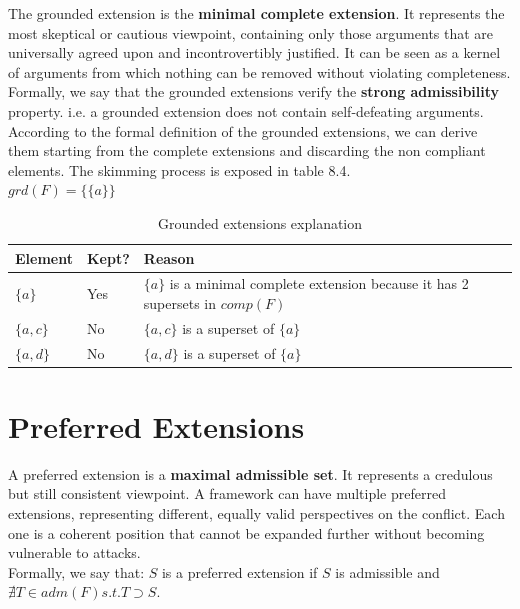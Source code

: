 \documentclass{scrbook}
\begin{document}
The grounded extension is the \textbf{minimal complete extension}. It represents the most skeptical or cautious viewpoint, containing only those arguments that are universally agreed upon and incontrovertibly justified. It can be seen as a kernel of arguments from which nothing can be removed without violating completeness. Formally, we say that the grounded extensions verify the \textbf{strong admissibility} property. i.e. a grounded extension does not contain self-defeating arguments. \\

According to the formal definition of the grounded extensions, we can derive them starting from the complete extensions and discarding the non compliant elements. The skimming process is exposed in table 8.4.\\

$grd(F) = \{\{a\}\}$

\begin{table}
    \begin{tabularx}{\linewidth}{|p{5em}|p{4em}|X|} \hline
         \textbf{Element} & \textbf{Kept?} & \textbf{Reason} \\ \hline

        $\{a\}$ & Yes &
        $\{a\}$ is a minimal complete extension because it has 2 supersets in $comp(F)$\\ \hline

        $\{a,c\}$ & No &
        $\{a,c\}$ is a superset of $\{a\}$\\ \hline

        $\{a,d\}$ & No &
        $\{a,d\}$ is a superset of $\{a\}$\\ \hline
    \end{tabularx}
    \caption{Grounded extensions explanation}
\end{table}

\section{Preferred Extensions}

A preferred extension is a \textbf{maximal admissible set}. It represents a credulous but still consistent viewpoint. A framework can have multiple preferred extensions, representing different, equally valid perspectives on the conflict. Each one is a coherent position that cannot be expanded further without becoming vulnerable to attacks. \\

Formally, we say that: $S$ is a preferred extension if $S$ is admissible and $\nexists T \in adm(F) s.t. T \supset S$. \\
\end{document}
